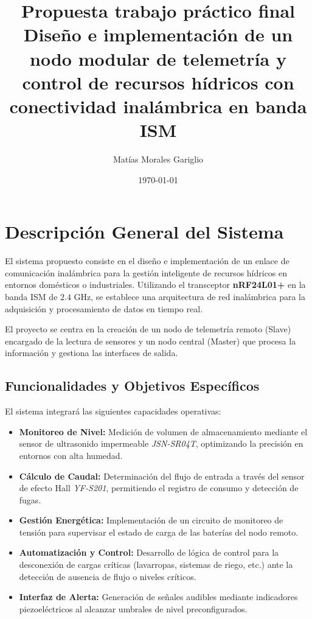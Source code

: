 \documentclass[12pt,a4paper]{article}
\title{
    \textbf{Propuesta trabajo práctico final} \\
    \vspace{0.5cm}
    \large Diseño e implementación de un nodo modular de telemetría y control de recursos hídricos con conectividad inalámbrica en banda ISM
}
\author{Matías Morales Gariglio}
\date{\today}
\begin{document}
\maketitle

\section{Descripción General del Sistema}

El sistema propuesto consiste en el diseño e implementación de un enlace de comunicación inalámbrica para la gestión inteligente de recursos hídricos en entornos domésticos o industriales. Utilizando el transceptor \textbf{nRF24L01+} en la banda ISM de $2.4$ GHz, se establece una arquitectura de red inalámbrica para la adquisición y procesamiento de datos en tiempo real.

El proyecto se centra en la creación de un nodo de telemetría remoto (Slave) encargado de la lectura de sensores y un nodo central (Master) que procesa la información y gestiona las interfaces de salida.

\subsection{Funcionalidades y Objetivos Específicos}

El sistema integrará las siguientes capacidades operativas:

\begin{itemize}
    \item \textbf{Monitoreo de Nivel:} Medición de volumen de almacenamiento mediante el sensor de ultrasonido impermeable \textit{JSN-SR04T}, optimizando la precisión en entornos con alta humedad.
    \item \textbf{Cálculo de Caudal:} Determinación del flujo de entrada a través del sensor de efecto Hall \textit{YF-S201}, permitiendo el registro de consumo y detección de fugas.
    \item \textbf{Gestión Energética:} Implementación de un circuito de monitoreo de tensión para supervisar el estado de carga de las baterías del nodo remoto.
    \item \textbf{Automatización y Control:} Desarrollo de lógica de control para la desconexión de cargas críticas (lavarropas, sistemas de riego, etc.) ante la detección de ausencia de flujo o niveles críticos.
    \item \textbf{Interfaz de Alerta:} Generación de señales audibles mediante indicadores piezoeléctricos al alcanzar umbrales de nivel preconfigurados.
\end{itemize}
\end{document}
